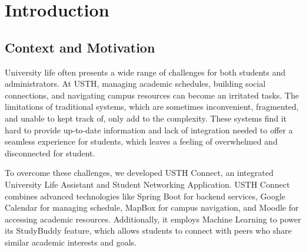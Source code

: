 \documentclass{article}
\begin{document}


\renewcommand{\listfigurename}{LIST OF FIGURES}
\renewcommand{\cftloftitlefont}{\Large\bfseries} 
\renewcommand{\cftafterloftitle}{
    \par\noindent\vspace{-0.5em}
    \textcolor{blue}{\rule{\textwidth}{0.5pt}}
    \vspace{1em} 
}
\renewcommand{\cftfigpresnum}{Figure~}
\renewcommand{\cftfigaftersnum}{:}
\setlength{\cftfignumwidth}{5em}

\tableofcontents
\newpage

\listoffigures
\renewcommand{\listtablename}{LIST OF TABLES}
\renewcommand{\cftlottitlefont}{\Large\bfseries} 
\renewcommand{\cftafterlottitle}{
    \par\noindent\vspace{-0.5em}
    \textcolor{blue}{\rule{\textwidth}{0.5pt}}
    \vspace{1em} 
}
\renewcommand{\cfttabpresnum}{Table~}
\renewcommand{\cfttabaftersnum}{:}
\setlength{\cfttabnumwidth}{5em}
\newpage

\listoftables
\newpage



\section{Introduction}

\subsection{Context and Motivation}
University life often presents a wide range of challenges for both students and administrators. At USTH, managing academic schedules, building social connections, and navigating campus resources can become an irritated tasks.
The limitations of traditional systems, which are sometimes inconvenient, fragmented, and unable to kept track of, only add to the complexity.
These systems find it hard to provide up-to-date information and lack of integration needed to offer a seamless experience for students, which leaves a feeling of overwhelmed and disconnected for student.

To overcome these challenges, we developed USTH Connect, an integrated University Life Assistant and Student Networking Application.
USTH Connect combines advanced technologies like Spring Boot for backend services, Google Calendar for managing schedule, MapBox for campus navigation, and Moodle for accessing academic resources. Additionally, it employs Machine Learning to power its StudyBuddy feature, which allows students to connect with peers who share similar academic interests and goals.
\end{document}
